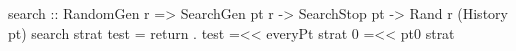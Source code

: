 search :: RandomGen r => SearchGen pt r -> SearchStop pt
       -> Rand r (History pt)
search strat test =
  return . test =<< everyPt strat 0 =<< pt0 strat
